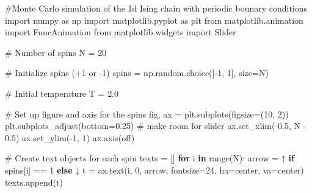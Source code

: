 \documentclass[
  letterpaper,
  enabledeprecatedfontcommands]{report}
\newenvironment{Shaded}{\begin{snugshade}}{\end{snugshade}}
\newcommand{\BuiltInTok}[1]{\textcolor[rgb]{0.00,0.23,0.31}{#1}}
\newcommand{\CommentTok}[1]{\textcolor[rgb]{0.37,0.37,0.37}{#1}}
\newcommand{\ControlFlowTok}[1]{\textcolor[rgb]{0.00,0.23,0.31}{\textbf{#1}}}
\newcommand{\DecValTok}[1]{\textcolor[rgb]{0.68,0.00,0.00}{#1}}
\newcommand{\FloatTok}[1]{\textcolor[rgb]{0.68,0.00,0.00}{#1}}
\newcommand{\ImportTok}[1]{\textcolor[rgb]{0.00,0.46,0.62}{#1}}
\newcommand{\KeywordTok}[1]{\textcolor[rgb]{0.00,0.23,0.31}{\textbf{#1}}}
\newcommand{\NormalTok}[1]{\textcolor[rgb]{0.00,0.23,0.31}{#1}}
\newcommand{\OperatorTok}[1]{\textcolor[rgb]{0.37,0.37,0.37}{#1}}
\newcommand{\StringTok}[1]{\textcolor[rgb]{0.13,0.47,0.30}{#1}}
\begin{document}
\begin{Shaded}
\begin{Highlighting}[]
\CommentTok{\#Monte Carlo simulation of the 1d Ising chain with periodic bounary conditions}
\ImportTok{import}\NormalTok{ numpy }\ImportTok{as}\NormalTok{ np}
\ImportTok{import}\NormalTok{ matplotlib.pyplot }\ImportTok{as}\NormalTok{ plt}
\ImportTok{from}\NormalTok{ matplotlib.animation }\ImportTok{import}\NormalTok{ FuncAnimation}
\ImportTok{from}\NormalTok{ matplotlib.widgets }\ImportTok{import}\NormalTok{ Slider}

\CommentTok{\# Number of spins}
\NormalTok{N }\OperatorTok{=} \DecValTok{20} 

\CommentTok{\# Initialize spins (+1 or {-}1)}
\NormalTok{spins }\OperatorTok{=}\NormalTok{ np.random.choice([}\OperatorTok{{-}}\DecValTok{1}\NormalTok{, }\DecValTok{1}\NormalTok{], size}\OperatorTok{=}\NormalTok{N)}

\CommentTok{\# Initial temperature}
\NormalTok{T }\OperatorTok{=} \FloatTok{2.0}

\CommentTok{\# Set up figure and axis for the spins}
\NormalTok{fig, ax }\OperatorTok{=}\NormalTok{ plt.subplots(figsize}\OperatorTok{=}\NormalTok{(}\DecValTok{10}\NormalTok{, }\DecValTok{2}\NormalTok{))}
\NormalTok{plt.subplots\_adjust(bottom}\OperatorTok{=}\FloatTok{0.25}\NormalTok{)  }\CommentTok{\# make room for slider}
\NormalTok{ax.set\_xlim(}\OperatorTok{{-}}\FloatTok{0.5}\NormalTok{, N }\OperatorTok{{-}} \FloatTok{0.5}\NormalTok{)}
\NormalTok{ax.set\_ylim(}\OperatorTok{{-}}\DecValTok{1}\NormalTok{, }\DecValTok{1}\NormalTok{)}
\NormalTok{ax.axis(}\StringTok{\textquotesingle{}off\textquotesingle{}}\NormalTok{)}

\CommentTok{\# Create text objects for each spin}
\NormalTok{texts }\OperatorTok{=}\NormalTok{ []}
\ControlFlowTok{for}\NormalTok{ i }\KeywordTok{in} \BuiltInTok{range}\NormalTok{(N):}
\NormalTok{    arrow }\OperatorTok{=} \StringTok{\textquotesingle{}↑\textquotesingle{}} \ControlFlowTok{if}\NormalTok{ spins[i] }\OperatorTok{==} \DecValTok{1} \ControlFlowTok{else} \StringTok{\textquotesingle{}↓\textquotesingle{}}
\NormalTok{    t }\OperatorTok{=}\NormalTok{ ax.text(i, }\DecValTok{0}\NormalTok{, arrow, fontsize}\OperatorTok{=}\DecValTok{24}\NormalTok{, ha}\OperatorTok{=}\StringTok{\textquotesingle{}center\textquotesingle{}}\NormalTok{, va}\OperatorTok{=}\StringTok{\textquotesingle{}center\textquotesingle{}}\NormalTok{)}
\NormalTok{    texts.append(t)}


\end{Highlighting}
\end{Shaded}
\end{document}
